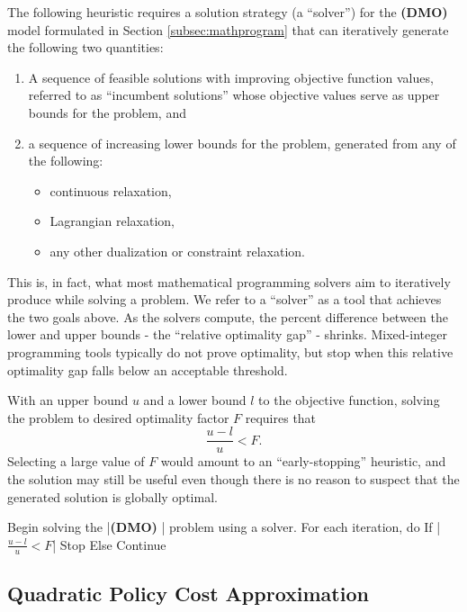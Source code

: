 \documentclass{article}
\newcommand{\model}{{\bf (DMO) }}
\begin{document}
The following heuristic requires a solution strategy (a ``solver'') for the \model model formulated in Section \ref{subsec:mathprogram} that can iteratively generate the following two quantities:
\begin{enumerate}
    \item A sequence of feasible solutions with improving objective function values, referred to as ``incumbent solutions'' whose objective values serve as upper bounds for the problem, and
    \item a sequence of increasing lower bounds for the problem, generated from any of the following:
          \begin{itemize}
              \item continuous relaxation,
              \item Lagrangian relaxation,
              \item any other dualization or constraint relaxation.
          \end{itemize}
\end{enumerate}
This is, in fact, what most mathematical programming solvers aim to iteratively produce while solving a problem. We refer to a ``solver'' as a tool that achieves the two goals above. As the solvers compute, the percent difference between the lower and upper bounds - the ``relative optimality gap'' - shrinks. Mixed-integer programming tools typically do not prove optimality, but stop when this relative optimality gap falls below an acceptable threshold.

With an upper bound $u$ and a lower bound $l$ to the objective function, solving the problem to desired optimality factor $F$ requires that
\[
    \frac{u-l}{u} < F.
\]
Selecting a large value of $F$ would amount to an ``early-stopping'' heuristic, and the solution may still be useful even though there is no reason to suspect that the generated solution is globally optimal.

\begin{pseudocode}
    Begin solving the |\model| problem using a solver. For each iteration, do
        If |$\frac{u-l}{u} < F$|
            Stop
        Else
            Continue
\end{pseudocode}

\subsection{Quadratic Policy Cost Approximation}\label{sec:quadratic_approximation}
\end{document}
